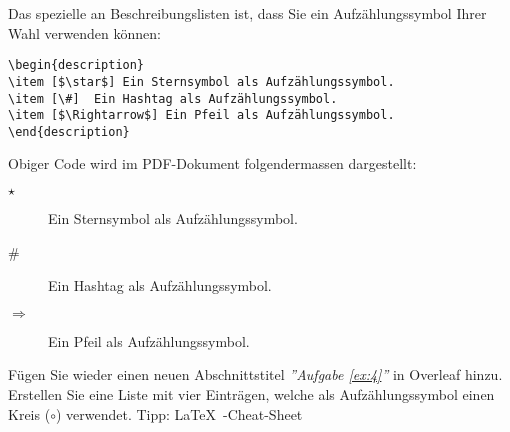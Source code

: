 \vspace{5mm}
\noindent Das spezielle an Beschreibungslisten ist, dass Sie ein Aufzählungssymbol Ihrer Wahl verwenden können:
\begin{verbatim}
\begin{description}
\item [$\star$] Ein Sternsymbol als Aufzählungssymbol.
\item [\#]  Ein Hashtag als Aufzählungssymbol.
\item [$\Rightarrow$] Ein Pfeil als Aufzählungssymbol.
\end{description}
\end{verbatim}
Obiger Code wird im PDF-Dokument folgendermassen dargestellt:
\begin{description}
\item [$\star$] Ein Sternsymbol als Aufzählungssymbol.
\item [\#]  Ein Hashtag als Aufzählungssymbol.
\item [$\Rightarrow$] Ein Pfeil als Aufzählungssymbol.
\end{description}

\vspace{3mm}
\begin{ex} \label{ex:4}
Fügen Sie wieder einen neuen Abschnittstitel \emph{''Aufgabe \ref{ex:4}''}  in Overleaf hinzu.\\
Erstellen Sie eine Liste mit vier Einträgen, welche als Aufzählungssymbol einen Kreis ($\circ$) verwendet. Tipp: \LaTeX\ -Cheat-Sheet
\end{ex}